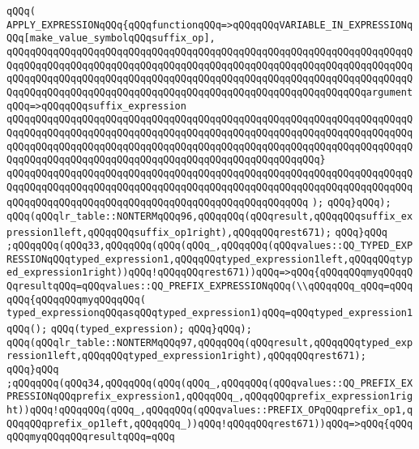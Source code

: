 \verb|qQQq(|\newline
\verb|APPLY_EXPRESSIONqQQq{qQQqfunctionqQQq=>qQQqqQQqVARIABLE_IN_EXPRESSIONqQQq[make_value_symbolqQQqsuffix_op],|\newline
\verb|qQQqqQQqqQQqqQQqqQQqqQQqqQQqqQQqqQQqqQQqqQQqqQQqqQQqqQQqqQQqqQQqqQQqqQQqqQQqqQQqqQQqqQQqqQQqqQQqqQQqqQQqqQQqqQQqqQQqqQQqqQQqqQQqqQQqqQQqqQQqqQQqqQQqqQQqqQQqqQQqqQQqqQQqqQQqqQQqqQQqqQQqqQQqqQQqqQQqqQQqqQQqqQQqqQQqqQQqqQQqqQQqqQQqqQQqqQQqqQQqqQQqqQQqqQQqqQQqqQQqqQQqqQQqqQQqargumentqQQq=>qQQqqQQqsuffix_expression|\newline
\verb|qQQqqQQqqQQqqQQqqQQqqQQqqQQqqQQqqQQqqQQqqQQqqQQqqQQqqQQqqQQqqQQqqQQqqQQqqQQqqQQqqQQqqQQqqQQqqQQqqQQqqQQqqQQqqQQqqQQqqQQqqQQqqQQqqQQqqQQqqQQqqQQqqQQqqQQqqQQqqQQqqQQqqQQqqQQqqQQqqQQqqQQqqQQqqQQqqQQqqQQqqQQqqQQqqQQqqQQqqQQqqQQqqQQqqQQqqQQqqQQqqQQqqQQqqQQqqQQqqQQqqQQq}|\newline
\verb|qQQqqQQqqQQqqQQqqQQqqQQqqQQqqQQqqQQqqQQqqQQqqQQqqQQqqQQqqQQqqQQqqQQqqQQqqQQqqQQqqQQqqQQqqQQqqQQqqQQqqQQqqQQqqQQqqQQqqQQqqQQqqQQqqQQqqQQqqQQqqQQqqQQqqQQqqQQqqQQqqQQqqQQqqQQqqQQqqQQqqQQqqQQqqQQq|\newline
\verb|);|\newline
\verb|qQQq}qQQq);|\newline
\verb|qQQq(qQQqlr_table::NONTERMqQQq96,qQQqqQQq(qQQqresult,qQQqqQQqsuffix_expression1left,qQQqqQQqsuffix_op1right),qQQqqQQqrest671);|\newline
\verb|qQQq}qQQq|\newline
\verb|;qQQqqQQq(qQQq33,qQQqqQQq(qQQq(qQQq_,qQQqqQQq(qQQqvalues::QQ_TYPED_EXPRESSIONqQQqtyped_expression1,qQQqqQQqtyped_expression1left,qQQqqQQqtyped_expression1right))qQQq!qQQqqQQqrest671))qQQq=>qQQq{qQQqqQQqmyqQQqqQQqresultqQQq=qQQqvalues::QQ_PREFIX_EXPRESSIONqQQq(\\qQQqqQQq_qQQq=qQQqqQQq{qQQqqQQqmyqQQqqQQq(|\newline
\verb|typed_expressionqQQqasqQQqtyped_expression1)qQQq=qQQqtyped_expression1qQQq();|\newline
\verb|qQQq(typed_expression);|\newline
\verb|qQQq}qQQq);|\newline
\verb|qQQq(qQQqlr_table::NONTERMqQQq97,qQQqqQQq(qQQqresult,qQQqqQQqtyped_expression1left,qQQqqQQqtyped_expression1right),qQQqqQQqrest671);|\newline
\verb|qQQq}qQQq|\newline
\verb|;qQQqqQQq(qQQq34,qQQqqQQq(qQQq(qQQq_,qQQqqQQq(qQQqvalues::QQ_PREFIX_EXPRESSIONqQQqprefix_expression1,qQQqqQQq_,qQQqqQQqprefix_expression1right))qQQq!qQQqqQQq(qQQq_,qQQqqQQq(qQQqvalues::PREFIX_OPqQQqprefix_op1,qQQqqQQqprefix_op1left,qQQqqQQq_))qQQq!qQQqqQQqrest671))qQQq=>qQQq{qQQqqQQqmyqQQqqQQqresultqQQq=qQQq|\newline
